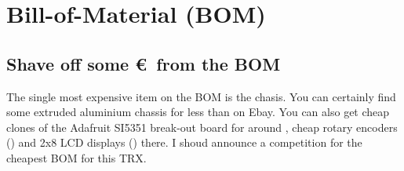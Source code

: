 \documentclass[10pt, a4paper,twoside]{scrartcl}
\begin{document}
\section{Bill-of-Material (BOM)}


\subsection{Shave off some \euro\ from the BOM}
The single most expensive item on the BOM is the chasis. You can certainly find some extruded aluminium chassis for less than  on Ebay. You can also get cheap clones of the Adafruit SI5351 break-out board for around , cheap rotary encoders () and 2x8 LCD displays () there. I shoud announce a competition for the cheapest BOM for this TRX.

\cleardoublepage








\end{document}
